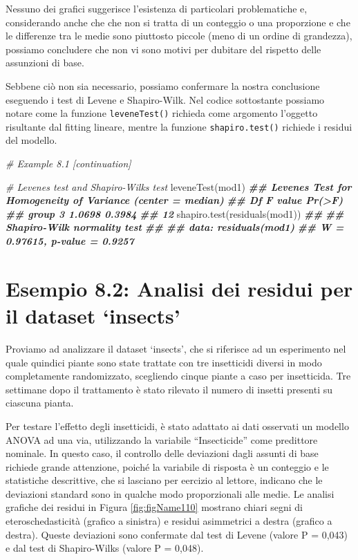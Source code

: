 \documentclass[
  12pt,
]{book}
\newenvironment{Shaded}{\begin{snugshade}}{\end{snugshade}}
\newcommand{\CommentTok}[1]{\textcolor[rgb]{0.56,0.35,0.01}{\textit{#1}}}
\newcommand{\DocumentationTok}[1]{\textcolor[rgb]{0.56,0.35,0.01}{\textbf{\textit{#1}}}}
\newcommand{\FunctionTok}[1]{\textcolor[rgb]{0.00,0.00,0.00}{#1}}
\newcommand{\NormalTok}[1]{#1}
\begin{document}
Nessuno dei grafici suggerisce l'esistenza di particolari problematiche e, considerando anche che che non si tratta di un conteggio o una proporzione e che le differenze tra le medie sono piuttosto piccole (meno di un ordine di grandezza), possiamo concludere che non vi sono motivi per dubitare del rispetto delle assunzioni di base.

Sebbene ciò non sia necessario, possiamo confermare la nostra conclusione eseguendo i test di Levene e Shapiro-Wilk. Nel codice sottostante possiamo notare come la funzione \texttt{leveneTest()} richieda come argomento l'oggetto risultante dal fitting lineare, mentre la funzione \texttt{shapiro.test()} richiede i residui del modello.

\begin{Shaded}
\begin{Highlighting}[]
\CommentTok{\# Example 8.1 [continuation]}

\CommentTok{\# Levene\textquotesingle{}s test and Shapiro{-}Wilk\textquotesingle{}s test}
\FunctionTok{leveneTest}\NormalTok{(mod1)}
\DocumentationTok{\#\# Levene\textquotesingle{}s Test for Homogeneity of Variance (center = median)}
\DocumentationTok{\#\#       Df F value Pr(\textgreater{}F)}
\DocumentationTok{\#\# group  3  1.0698 0.3984}
\DocumentationTok{\#\#       12}
\FunctionTok{shapiro.test}\NormalTok{(}\FunctionTok{residuals}\NormalTok{(mod1))}
\DocumentationTok{\#\# }
\DocumentationTok{\#\#  Shapiro{-}Wilk normality test}
\DocumentationTok{\#\# }
\DocumentationTok{\#\# data:  residuals(mod1)}
\DocumentationTok{\#\# W = 0.97615, p{-}value = 0.9257}
\end{Highlighting}
\end{Shaded}

\hypertarget{esempio-8.2-analisi-dei-residui-per-il-dataset-insects}{%
\section{Esempio 8.2: Analisi dei residui per il dataset `insects'}\label{esempio-8.2-analisi-dei-residui-per-il-dataset-insects}}

Proviamo ad analizzare il dataset `insects', che si riferisce ad un esperimento nel quale quindici piante sono state trattate con tre insetticidi diversi in modo completamente randomizzato, scegliendo cinque piante a caso per insetticida. Tre settimane dopo il trattamento è stato rilevato il numero di insetti presenti su ciascuna pianta.

Per testare l'effetto degli insetticidi, è stato adattato ai dati osservati un modello ANOVA ad una via, utilizzando la variabile ``Insecticide'' come predittore nominale. In questo caso, il controllo delle deviazioni dagli assunti di base richiede grande attenzione, poiché la variabile di risposta è un conteggio e le statistiche descrittive, che si lasciano per eercizio al lettore, indicano che le deviazioni standard sono in qualche modo proporzionali alle medie. Le analisi grafiche dei residui in Figura \ref{fig:figName110} mostrano chiari segni di eteroschedasticità (grafico a sinistra) e residui asimmetrici a destra (grafico a destra). Queste deviazioni sono confermate dal test di Levene (valore P = 0,043) e dal test di Shapiro-Wilks (valore P = 0,048).
\end{document}
